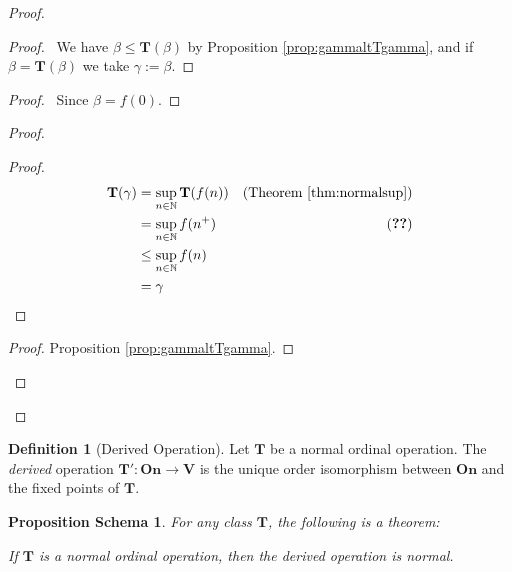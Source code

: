 \documentclass{book}
\let\qed\relax
\newtheorem{props}[ax]{Proposition Schema}
\theoremstyle{definition}
\newtheorem{df}[ax]{Definition}
\begin{document}
\begin{proof}
\pf
{}
\begin{proof}
	\pf\ We have $\beta \leq \mathbf{T}(\beta)$ by Proposition \ref{prop:gammaltTgamma}, and if $\beta = \mathbf{T}(\beta)$ we take $\gamma := \beta$.
\end{proof}
\begin{proof}
	\pf\ Since $\beta = f(0)$.
\end{proof}
\begin{proof}
	\begin{proof}
	\pf
	\begin{align*}
		\mathbf{T}(\gamma) & = \sup_{n \in \mathbb{N}} \mathbf{T}(f(n)) & (\text{Theorem \ref{thm:normalsup}}) \\
		& = \sup_{n \in \mathbb{N}} f(n^+) & (\text{\stepref{3}}) \\
		& \leq \sup_{n \in \mathbb{N}} f(n) \\
		& = \gamma
	\end{align*}
	\end{proof}
	\begin{proof}
		\pf Proposition \ref{prop:gammaltTgamma}.
	\end{proof}
\end{proof}
\qed
\end{proof}

\begin{df}[Derived Operation]
Let $\mathbf{T}$ be a normal ordinal operation. The \emph{derived} operation $\mathbf{T}' : \mathbf{On} \rightarrow \mathbf{V}$ is the unique order isomorphism between $\mathbf{On}$ and the fixed points of $\mathbf{T}$.
\end{df}

\begin{props}
For any class $\mathbf{T}$, the following is a theorem:

If $\mathbf{T}$ is a normal ordinal operation, then the derived operation is normal.
\end{props}
\end{document}
